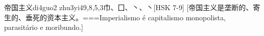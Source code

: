 \begin{EntryWithPhonetic}{帝国主义}{di4guo2 zhu3yi4}{9,8,5,3}{⼱、⼞、⼂、⼂}[HSK 7-9]
  [帝国主义是垄断的、寄生的、垂死的资本主义。===Imperialismo é capitalismo monopolista, parasitário e moribundo.]
\end{EntryWithPhonetic}
